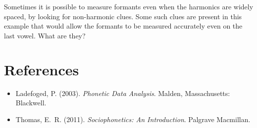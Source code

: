 \documentclass[12pt, letterpaper]{article}
\begin{document}
Sometimes it is possible to measure formants even when the harmonics are widely spaced, by looking for non-harmonic clues. Some such clues are present in this example that would allow the formants to be measured accurately even on the last vowel. What are they?

\section*{References}

\begin{itemize}[leftmargin=1.5em]
    \item Ladefoged, P. (2003). \textit{Phonetic Data Analysis}. Malden, Massachusetts: Blackwell.
    \item Thomas, E.~R. (2011). \textit{Sociophonetics: An Introduction}. Palgrave Macmillan.
\end{itemize}















\end{document}
